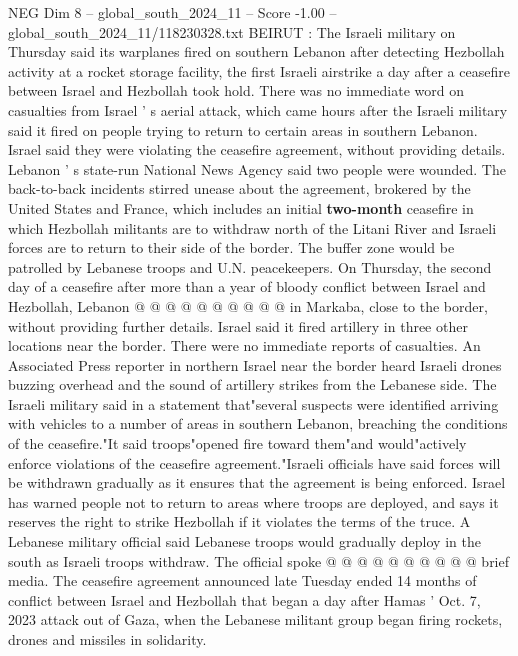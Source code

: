 \begin{textsample}{NEG Dim 8 – global\_south\_2024\_11 – Score -1.00 – global\_south\_2024\_11/118230328.txt}  \label{ex:f8_neg_315}
BEIRUT : The Israeli military on Thursday said its warplanes fired on southern Lebanon after detecting Hezbollah activity at a rocket storage facility, the first Israeli airstrike a day after a ceasefire between Israel and Hezbollah took hold.
There was no immediate word on casualties from Israel ' s aerial attack, which came hours after the Israeli military said it fired on people trying to return to certain areas in southern Lebanon.
Israel said they were violating the ceasefire agreement, without providing details.
Lebanon ' s state-run National News Agency said two people were wounded.
The back-to-back incidents stirred unease about the agreement, brokered by the United States and France, which includes an initial \textbf{two-month} ceasefire in which Hezbollah militants are to withdraw north of the Litani River and Israeli forces are to return to their side of the border.
The buffer zone would be patrolled by Lebanese troops and U.N. peacekeepers.
On Thursday, the second day of a ceasefire after more than a year of bloody conflict between Israel and Hezbollah, Lebanon @ @ @ @ @ @ @ @ @ @ in Markaba, close to the border, without providing further details.
Israel said it fired artillery in three other locations near the border.
There were no immediate reports of casualties.
An Associated Press reporter in northern Israel near the border heard Israeli drones buzzing overhead and the sound of artillery strikes from the Lebanese side.
The Israeli military said in a statement that"several suspects were identified arriving with vehicles to a number of areas in southern Lebanon, breaching the conditions of the ceasefire."It said troops"opened fire toward them"and would"actively enforce violations of the ceasefire agreement."Israeli officials have said forces will be withdrawn gradually as it ensures that the agreement is being enforced.
Israel has warned people not to return to areas where troops are deployed, and says it reserves the right to strike Hezbollah if it violates the terms of the truce.
A Lebanese military official said Lebanese troops would gradually deploy in the south as Israeli troops withdraw.
The official spoke @ @ @ @ @ @ @ @ @ @ brief media.
The ceasefire agreement announced late Tuesday ended 14 months of conflict between Israel and Hezbollah that began a day after Hamas ' Oct. 7, 2023 attack out of Gaza, when the Lebanese militant group began firing rockets, drones and missiles in solidarity.

\end{textsample}
